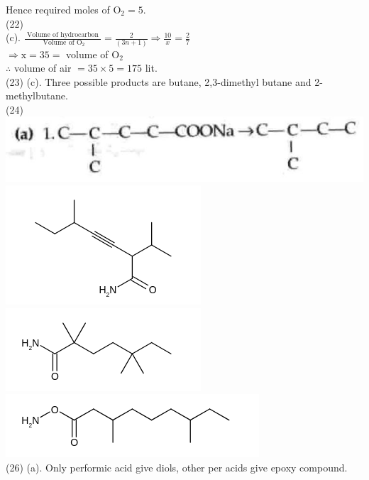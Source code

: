 \documentclass[10pt]{article}
\begin{document}
Hence required moles of $\mathrm{O}_{2}=5$.\\
(22)\\
(c). $\frac{\text { Volume of hydrocarbon }}{\text { Volume of } \mathrm{O}_{2}}=\frac{2}{(3 n+1)} \Rightarrow \frac{10}{x}=\frac{2}{7}$\\
$\Rightarrow \mathrm{x}=35=$ volume of $\mathrm{O}_{2}$\\
$\therefore$ volume of air $=35 \times 5=175$ lit.\\
(23) (c). Three possible products are butane, 2,3-dimethyl butane and 2-methylbutane.\\
(24)\\
\includegraphics[max width=\textwidth, center]{2025_01_28_8470952b98110cec3aabg-241(2)}\\
\includegraphics{smile-97dcbe7bbe178d91465b43d3bc1bf69fffc78772}\\
\includegraphics{smile-4f67fef382064ec1e19e3b8e23954bdee9a3afcc}\\
\includegraphics{smile-304c1858fa642eef6f92c1fb72c6f0d6c4665a4c}\\
(26) (a). Only performic acid give diols, other per acids give epoxy compound.\\
\end{document}
